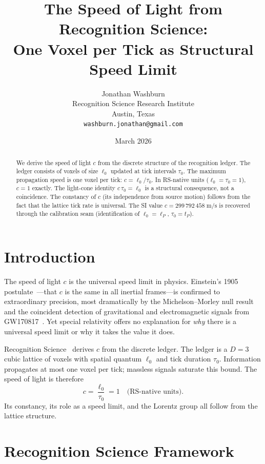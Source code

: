\documentclass[12pt,a4paper]{article}
\title{The Speed of Light from Recognition Science:\\
One Voxel per Tick as Structural Speed Limit}
\author{Jonathan Washburn\\
Recognition Science Research Institute\\
Austin, Texas\\
\texttt{washburn.jonathan@gmail.com}}
\date{March 2026}
\theoremstyle{definition}
\theoremstyle{remark}
\begin{document}
\maketitle

\begin{abstract}
We derive the speed of light $c$ from the discrete structure of the
recognition ledger.  The ledger consists of voxels of size $\ell_0$
updated at tick intervals $\tau_0$.  The maximum propagation speed is
one voxel per tick: $c = \ell_0/\tau_0$.  In RS-native units
($\ell_0 = \tau_0 = 1$), $c = 1$ exactly.  The light-cone identity
$c\,\tau_0 = \ell_0$ is a structural consequence, not a coincidence.
The constancy of $c$ (its independence from source motion) follows from
the fact that the lattice tick rate is universal.  The SI value
$c = 299\,792\,458\;\mathrm{m/s}$ is recovered through the calibration
seam (identification of $\ell_0 = \ell_P$, $\tau_0 = t_P$).
\end{abstract}

\section{Introduction}
\label{sec:intro}

The speed of light $c$ is the universal speed limit in physics.
Einstein's 1905 postulate~\cite{Einstein1905}---that $c$ is the
same in all inertial frames---is confirmed to extraordinary
precision, most dramatically by the Michelson--Morley null
result~\cite{MichelsonMorley1887} and the coincident detection
of gravitational and electromagnetic signals from
GW170817~\cite{GW170817}.  Yet special relativity offers no
explanation for \emph{why} there is a universal speed limit or
why it takes the value it does.

Recognition Science~\cite{RS_Axioms} derives $c$ from the discrete
ledger.  The ledger is a $D = 3$ cubic lattice of voxels with
spatial quantum $\ell_0$ and tick duration $\tau_0$.  Information
propagates at most one voxel per tick; massless signals saturate
this bound.  The speed of light is therefore
\begin{equation}
  c = \frac{\ell_0}{\tau_0} = 1\quad\text{(RS-native units)}.
\end{equation}
Its constancy, its role as a speed limit, and the Lorentz group
all follow from the lattice structure.

\section{Recognition Science Framework}
\label{sec:framework}
\end{document}
